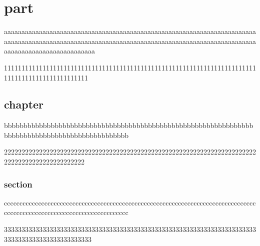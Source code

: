 \documentclass{jbook}
\begin{document}
\part{part}
aaaaaaaaaaaaaaaaaaaaaaaaaaaaaaaaaaaaaaaaaaaaaaaaaaaaaaaaaaaaaaaaaaaaaaaaaaaaaaaaaaaaaaaaaaaaaaaaaaaaaaaaaaaaaaaaaaaaaaaaaaaaaaaaaaaaaaaaaaaaaaaaaaaaaaaaaaaaaaaaaaaaaaaaaa

111111111111111111111111111111111111111111111111111111111111111111111111111111111111111111111111


\chapter{chapter}
bbbbbbbbbbbbbbbbbbbbbbbbbbbbbbbbbbbbbbbbbbbbbbbbbbbbbbbbbbbbbbbbbbbbbbbbbbbbbbbbbbbbbbbbbbbbbbbb

22222222222222222222222222222222222222222222222222222222222222222222222222222222222222222222222

\section{section}

ccccccccccccccccccccccccccccccccccccccccccccccccccccccccccccccccccccccccccccccccccccccccccccccccccccccccccccccccccccccccc

3333333333333333333333333333333333333333333333333333333333333333333333333333333333333333333333333
\end{document}
